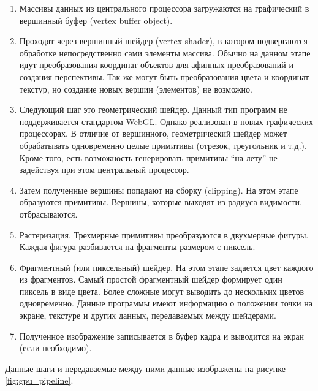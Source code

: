 \begin{enumerate}
  \item Массивы данных из центрального процессора загружаются на графический в вершинный буфер
    (vertex buffer object).

  \item Проходят через вершинный шейдер (vertex shader), в котором подвергаются обработке 
    непосредственно сами элементы массива. Обычно на данном этапе идут преобразования 
    координат объектов для афинных преобразований и создания перспективы. Так же 
    могут быть преобразования цвета и координат текстур, но создание новых вершин 
    (элементов) не возможно.

  \item Следующий шаг это геометрический шейдер. Данный тип программ не поддерживается
    стандартом WebGL. Однако реализован в новых графических процессорах. В отличие 
    от вершинного, геометрический шейдер может обрабатывать одновременно целые примитивы 
    (отрезок, треугольник и т.д.). Кроме того, есть возможность генерировать примитивы 
    ``на лету'' не задействуя при этом центральный процессор.

  \item Затем полученные вершины попадают на сборку (clipping). На этом этапе образуются
    примитивы. Вершины, которые выходят из радиуса видимости, отбрасываются.

  \item Растеризация. Трехмерные примитивы преобразуются в двухмерные фигуры. Каждая фигура
    разбивается на фрагменты размером с пиксель.

  \item Фрагментный (или пиксельный) шейдер. На этом этапе задается цвет каждого из фрагментов.
    Самый простой фрагментный шейдер формирует один пиксель в виде цвета. Более сложные могут 
    выводить до нескольких цветов одновременно. Данные программы имеют информацию о положении 
    точки на экране, текстуре и других данных, передаваемых между шейдерами.

  \item Полученное изображение записывается в буфер кадра и выводится на экран (если необходимо).
\end{enumerate}

Данные шаги и передаваемые между ними данные изображены на рисунке \ref{fig:gpu_pipeline}.

